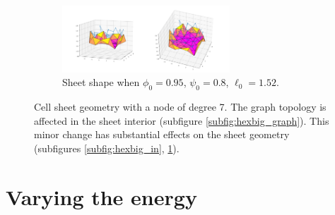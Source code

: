 \begin{figure}[htbp]
\begin{subfigure}[b]{\textwidth}
        \includegraphics[width=0.69\textwidth]{hexbig/hexbig0.95_0.8_1.35_10_plot.png}
        \caption{Sheet shape when $\phi_0=0.95$, $\psi_0=0.8$, $\ell_0=1.52$.}
        \label{subfig:hexbig_out}
    \end{subfigure}
    \caption{Cell sheet geometry with a node of degree 7. The graph topology is affected in the sheet interior (subfigure \ref{subfig:hexbig_graph}). This minor change has substantial effects on the sheet geometry (subfigures \ref{subfig:hexbig_in}, \ref{subfig:hexbig_out}).}
    \label{fig:hexbig}
\end{figure}

\section{Varying the energy}



